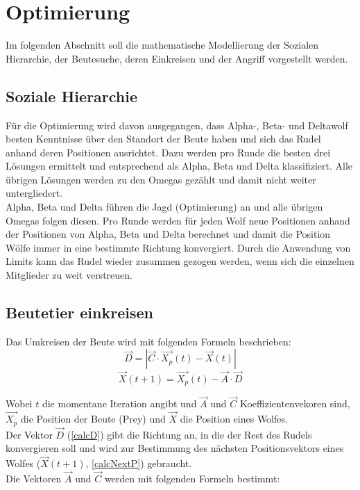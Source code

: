 \chapter{Optimierung}
Im folgenden Abschnitt soll die mathematische Modellierung der Sozialen Hierarchie, der Beutesuche, deren Einkreisen und der Angriff vorgestellt werden.


\section{Soziale Hierarchie}
Für die Optimierung wird davon ausgegangen, dass Alpha-, Beta- und Deltawolf besten Kenntnisse über den Standort der Beute haben und sich das Rudel anhand deren Positionen ausrichtet. Dazu werden pro Runde die besten drei Lösungen ermittelt und entsprechend als Alpha, Beta und Delta klassifiziert. Alle übrigen Lösungen werden zu den Omegas gezählt und damit nicht weiter untergliedert. \\
Alpha, Beta und Delta führen die Jagd (Optimierung) an und alle übrigen Omegas folgen diesen. Pro Runde werden für jeden Wolf neue Positionen anhand der Positionen von Alpha, Beta und Delta berechnet und damit die Position Wölfe immer in eine bestimmte Richtung konvergiert. Durch die Anwendung von Limits kann das Rudel wieder zusammen gezogen werden, wenn sich die einzelnen Mitglieder zu weit verstreuen.

\section{Beutetier einkreisen}
Das Umkreisen der Beute wird mit folgenden Formeln beschrieben:
\begin{equation}
    \vec{D} = |\vec{C} \cdot \vec{X_p}(t) - \vec{X}(t) |
    \label{calcD}
\end{equation}
\begin{equation}
    \vec{X}(t+1) = \vec{X_p}(t) - \vec{A} \cdot \vec{D}
    \label{calcNextP}
\end{equation}

Wobei $t$ die momentane Iteration angibt und $\vec{A}$ und $\vec{C}$ Koeffizientenvekoren sind, $\vec{X_p}$ die Position der Beute (Prey) und $\vec{X}$ die Position eines Wolfes.\\
Der Vektor $\vec{D}$ (\autoref{calcD}) gibt die Richtung an, in die der Rest des Rudels konvergieren soll und wird zur Bestimmung des nächsten Positionsvektors eines Wolfes ($\vec{X}(t+1)$, \autoref{calcNextP}) gebraucht.\\
Die Vektoren $\vec{A}$ und $\vec{C}$ werden mit folgenden Formeln bestimmt:

